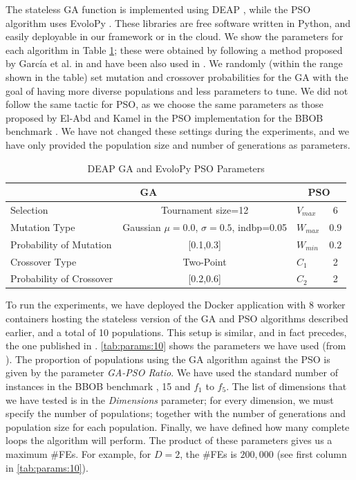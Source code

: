 \documentclass[runningheads]{llncs}
\begin{document}
The stateless GA function is implemented using DEAP
\cite{fortin2012deap}, while the PSO algorithm uses EvoloPy
\cite{faris2016evolopy}. These libraries are free software written in
Python, and easily deployable in our framework or in the cloud.  We
show the parameters for each algorithm in Table \ref{tab:GAparams};
these were obtained by following a method proposed by García et al. in
\cite{garcia2017benchmarking} and have been also used in
\cite{GARCIAVALDEZ2021234}. We randomly (within the range shown
in the table) set mutation and crossover probabilities for the GA with
the goal of having more diverse populations and less parameters to
tune. We did not follow the same tactic for PSO, as we choose the same
parameters as those proposed by El-Abd and Kamel in the PSO
implementation for the BBOB benchmark \cite{el2009blackHybrid}. We
have not changed these settings during the experiments, and we have
only provided the population size and number of generations as
parameters.

\begin{table}
  \small
  \caption{ DEAP GA and EvoloPy PSO Parameters }
  \label{tab:GAparams} 
  \centering
  \small
  \begin{tabular}{|l|c||l|c|}
    \hline
    \multicolumn{2}{|c||}{GA} & \multicolumn{2}{c|}{PSO} \\ \hline
    Selection & Tournament size=12 &      $V_{max}$ & 6                  \\ \hline
    Mutation Type &  Gaussian $\mu=0.0$, $\sigma=0.5$, indbp=0.05 & $W_{max}$ & $0.9$     \\ \hline
    Probability of Mutation & [0.1,0.3] &   $W_{min}$ & $0.2$                      \\ \hline
    Crossover Type & Two-Point   &       $C_1$ & 2                             \\ \hline
    Probability of Crossover  & [0.2,0.6] & $C_2$ & 2  \\ \hline
  \end{tabular}
\end{table}

To run the experiments, we have deployed the Docker application with 8 worker
containers hosting the stateless version of the GA and PSO algorithms described
earlier, and a total of 10 populations. This setup is similar, and in
fact precedes, the one published in \cite{GARCIAVALDEZ2021234}.
\autoref{tab:params:10} shows the parameters we have used (from \cite{GARCIAVALDEZ2021234}). 
The proportion of populations using the GA algorithm against the PSO is given by the parameter {\em
GA-PSO Ratio}. 
We have used the standard number of instances in the BBOB benchmark
\cite{hansen2016coco}, 15 and $f_1$ to $f_5$. The list of
dimensions that we have tested is in the {\em Dimensions} parameter;
for every dimension, we must specify the number of populations;
together with the number of generations and population
size for each population. Finally, we have defined how many complete loops the algorithm
will perform. The product of these parameters gives us a maximum
\#FEs. For example, for $D = 2$, the \#FEs is
$200,000$ (see first column in \autoref{tab:params:10}).
\end{document}
